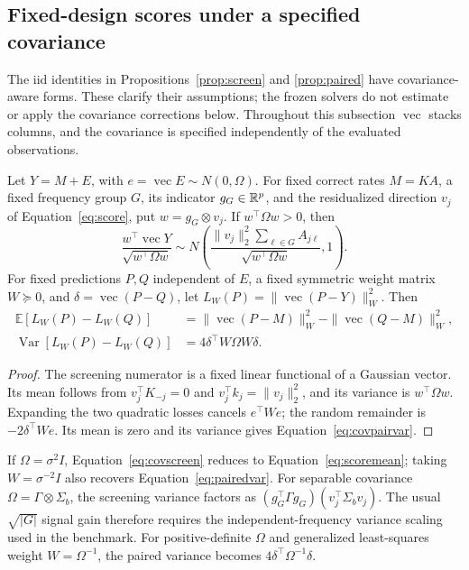 \subsection{Fixed-design scores under a specified covariance}\label{app:covariance}
The iid identities in Propositions~\ref{prop:screen} and \ref{prop:paired} have covariance-aware forms. These clarify their assumptions; the frozen solvers do not estimate or apply the covariance corrections below. Throughout this subsection $\operatorname{vec}$ stacks columns, and the covariance is specified independently of the evaluated observations.

\begin{Proposition}\label{prop:covariance}
Let $Y=M+E$, with $e=\operatorname{vec}E\sim N(0,\Omega)$. For fixed correct rates $M=KA$, a fixed frequency group $G$, its indicator $g_G\in\mathbb{R}^p$, and the residualized direction $v_j$ of Equation~\eqref{eq:score}, put $w=g_G\otimes v_j$. If $w^\top\Omega w>0$, then
\begin{equation}\label{eq:covscreen}
 \frac{w^\top\operatorname{vec}Y}{\sqrt{w^\top\Omega w}}
 \sim N\!\left(\frac{\|v_j\|_2^2\sum_{\ell\in G}A_{j\ell}}
                    {\sqrt{w^\top\Omega w}},1\right).
\end{equation}
For fixed predictions $P,Q$ independent of $E$, a fixed symmetric weight matrix $W\succeq0$, and $\delta=\operatorname{vec}(P-Q)$, let $L_W(P)=\|\operatorname{vec}(P-Y)\|_W^2$. Then
\begin{align}
 \mathbb E[L_W(P)-L_W(Q)]
 &=\|\operatorname{vec}(P-M)\|_W^2-\|\operatorname{vec}(Q-M)\|_W^2,\label{eq:covpairmean}\\
 \operatorname{Var}[L_W(P)-L_W(Q)]&=4\delta^\top W\Omega W\delta.\label{eq:covpairvar}
\end{align}
\end{Proposition}
\begin{proof}
The screening numerator is a fixed linear functional of a Gaussian vector. Its mean follows from $v_j^\top K_{-j}=0$ and $v_j^\top k_j=\|v_j\|_2^2$, and its variance is $w^\top\Omega w$. Expanding the two quadratic losses cancels $e^\top We$; the random remainder is $-2\delta^\top We$. Its mean is zero and its variance gives Equation~\eqref{eq:covpairvar}.
\end{proof}

If $\Omega=\sigma^2I$, Equation~\eqref{eq:covscreen} reduces to Equation~\eqref{eq:scoremean}; taking $W=\sigma^{-2}I$ also recovers Equation~\eqref{eq:pairedvar}. For separable covariance $\Omega=\Gamma\otimes\Sigma_b$, the screening variance factors as $(g_G^\top\Gamma g_G)(v_j^\top\Sigma_bv_j)$. The usual $\sqrt{|G|}$ signal gain therefore requires the independent-frequency variance scaling used in the benchmark. For positive-definite $\Omega$ and generalized least-squares weight $W=\Omega^{-1}$, the paired variance becomes $4\delta^\top\Omega^{-1}\delta$.

